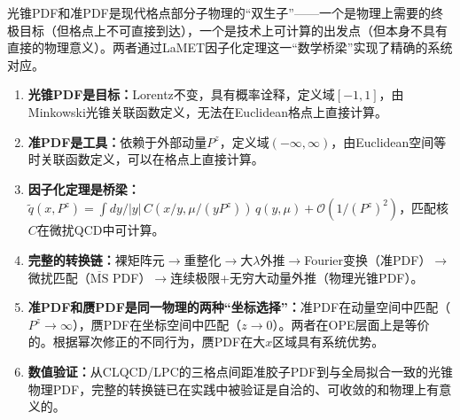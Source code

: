 \documentclass[12pt,a4paper]{ctexart}
\theoremstyle{definition}
\begin{document}
光锥PDF和准PDF是现代格点部分子物理的``双生子''——一个是物理上需要的终极目标（但格点上不可直接到达），一个是技术上可计算的出发点（但本身不具有直接的物理意义）。两者通过LaMET因子化定理这一``数学桥梁''实现了精确的系统对应。

\begin{enumerate}
    \item \textbf{光锥PDF是目标：}Lorentz不变，具有概率诠释，定义域$[-1,1]$，由Minkowski光锥关联函数定义，无法在Euclidean格点上直接计算\cite{Ji2013Euclidean,Izubuchi2018}。

    \item \textbf{准PDF是工具：}依赖于外部动量$P^z$，定义域$(-\infty,\infty)$，由Euclidean空间等时关联函数定义，可以在格点上直接计算\cite{Ji2013Euclidean,Liu2019isovector}。

    \item \textbf{因子化定理是桥梁：}$\tilde{q}(x,P^z) = \int dy/|y|\, C(x/y,\mu/(yP^z))\, q(y,\mu) + \mathcal{O}(1/(P^z)^2)$，匹配核$C$在微扰QCD中可计算\cite{Izubuchi2018}。

    \item \textbf{完整的转换链：}裸矩阵元$\to$重整化$\to$大$\lambda$外推$\to$Fourier变换（准PDF）$\to$微扰匹配（$\overline{\text{MS}}$ PDF）$\to$连续极限+无穷大动量外推（物理光锥PDF）\cite{Chen2025gluon}。

    \item \textbf{准PDF和赝PDF是同一物理的两种``坐标选择''：}准PDF在动量空间中匹配（$P^z\to\infty$），赝PDF在坐标空间中匹配（$z\to 0$）。两者在OPE层面上是等价的\cite{Izubuchi2018,Radyushkin2018one_loop}。根据幂次修正的不同行为，赝PDF在大$x$区域具有系统优势\cite{Braun2019power}。

    \item \textbf{数值验证：}从CLQCD/LPC的三格点间距准胶子PDF\cite{Chen2025gluon}到与全局拟合一致的光锥物理PDF，完整的转换链已在实践中被验证是自洽的、可收敛的和物理上有意义的。
\end{enumerate}
\end{document}
